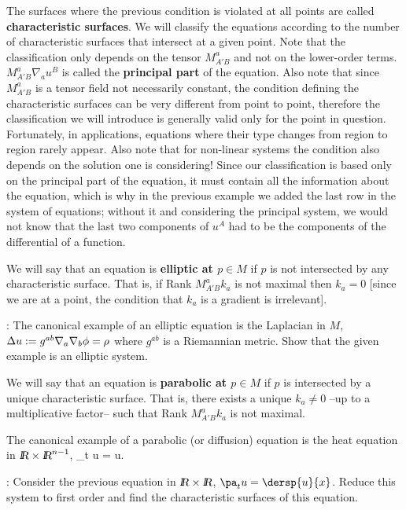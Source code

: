 The surfaces where the previous condition is violated at all points are called
{\bf characteristic surfaces}.
We will classify the equations according to the number of characteristic surfaces
that intersect at a given point.
Note that the classification only depends on the tensor $M^a_{A'B}$ and not on the lower-order terms.
$M^a_{A'B}\nabla_a u^B$ is called the {\bf principal part} of the equation.
Also note that since $M^a_{A'B}$
is a tensor field not necessarily constant, the condition
defining the characteristic surfaces can be very different
from point to point, therefore the classification we will introduce
is generally valid only for the point in question. Fortunately, in applications, equations where their type changes
from region to region rarely appear.
Also note that for non-linear systems
the condition also depends on the solution one is considering!
Since our classification is based only on the principal part of the
equation, it must contain all the information about the equation,
which is why in the previous example we added the last row in
the system of equations; without it and considering the principal system,
we would not know that the last two components of $u^A$ had to
be the components of the differential of a function.

We will say that an equation is {\bf elliptic at $p \in M$} if $p$ is not
intersected by any characteristic surface. That is, if
Rank $M^a_{A'B}k_a$ is not maximal then $k_a = 0$
[since we are at a point, the condition that $k_a$ is a gradient is
irrelevant].
\espa

\ejer: The canonical example of an elliptic equation is the Laplacian
in $M$, $\Delta u := g^{ab}\nabla_a\nabla_b \phi = \rho$ where $g^{ab}$ is a Riemannian metric.
Show that the given example is an elliptic system.
\espa

We will say that an equation is {\bf parabolic at $p \in M$} if $p$ is
intersected by a unique characteristic surface. That is, there exists
a unique $k_a \neq 0$ --up to a multiplicative factor-- such that
Rank $M^a_{A'B}k_a$ is not maximal.

The canonical example of a parabolic (or diffusion) equation is the
heat equation in $\re \times \re^{n-1}$,
\beq 
\partial_t u = \Delta u.
\eeq

\espa
\noi
\ejer: Consider the previous equation in $\re \times \re$,
$\pa_t u = \dersp{u}{x}$.
Reduce this system to first order and find the characteristic
surfaces of this equation.
\espa

